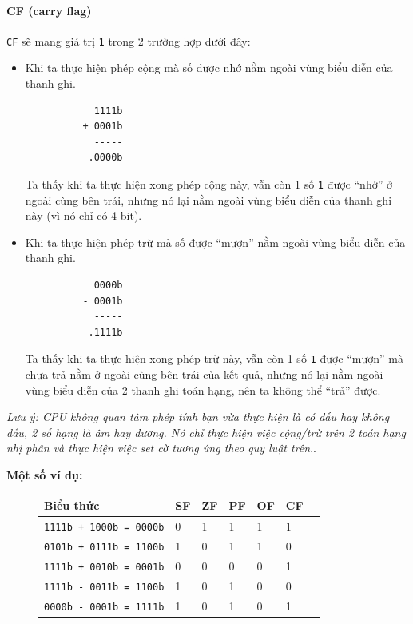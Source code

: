 \documentclass[12pt]{report}
\newcommand{\code}[1]{\texttt{#1}}
\begin{document}
\paragraph{CF (carry flag)}
\code{CF} sẽ mang giá trị \code 1 trong 2 trường hợp dưới đây:
\begin{itemize}
    \item Khi ta thực hiện phép cộng mà số được nhớ nằm ngoài vùng biểu diễn của thanh ghi.
        \begin{verbatim}
            1111b 
          + 0001b 
            -----
           .0000b 
        \end{verbatim}
    Ta thấy khi ta thực hiện xong phép cộng này, vẫn còn 1 số \code 1 được ``nhớ'' ở ngoài cùng bên trái, nhưng nó lại nằm ngoài vùng biểu diễn của thanh ghi này (vì nó chỉ có 4 bit).
    \item Khi ta thực hiện phép trừ mà số được ``mượn'' nằm ngoài vùng biểu diễn của thanh ghi.
        \begin{verbatim}
            0000b 
          - 0001b 
            -----
           .1111b 
        \end{verbatim}
    Ta thấy khi ta thực hiện xong phép trừ này, vẫn còn 1 số \code 1 được ``mượn'' mà chưa trả nằm ở ngoài cùng bên trái của kết quả, nhưng nó lại nằm ngoài vùng biểu diễn của 2 thanh ghi toán hạng, nên ta không thể ``trả'' được.
\end{itemize}

\textit{Lưu ý: CPU không quan tâm phép tính bạn vừa thực hiện là có dấu hay không dấu, 2 số hạng là âm hay dương. Nó chỉ thực hiện việc cộng/trừ trên 2 toán hạng nhị phân và thực hiện việc set cờ tương ứng theo quy luật trên}.\cite{overflow_note}.

\textbf{Một số ví dụ:} 
\begin{figure}[H]
    \centering
    \begin{tabular}{|l|l|l|l|l|l|l|}
    \hline
    Biểu thức                    & SF & ZF & PF & OF & CF \\
    \hline
    \code{1111b + 1000b = 0000b} & 0  & 1  & 1  & 1  & 1 \\
    \code{0101b + 0111b = 1100b} & 1  & 0  & 1  & 1  & 0 \\
    \code{1111b + 0010b = 0001b} & 0  & 0  & 0  & 0  & 1 \\
    \code{1111b - 0011b = 1100b} & 1  & 0  & 1  & 0  & 0 \\
    \code{0000b - 0001b = 1111b} & 1  & 0  & 1  & 0  & 1 \\
    \hline
    \end{tabular}
\end{figure}
\end{document}
